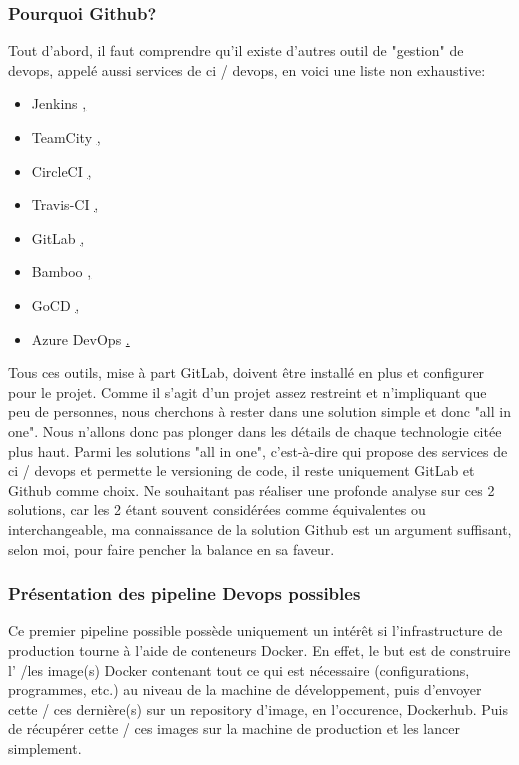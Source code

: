 \documentclass[
    iai, %
    il, %
]{heig-tb}
\begin{document}
\subsubsection{Pourquoi Github?}
Tout d'abord, il faut comprendre qu'il existe d'autres outil de "gestion" de \Gls{devops}, appelé aussi services de \Gls{ci} / \Gls{devops}, en voici une liste non exhaustive:
\begin{itemize}
    \item Jenkins \href{https://www.jenkins.io/},
    \item TeamCity \href{https://www.jetbrains.com/teamcity/},
    \item CircleCI \href{https://www.guru99.com/top-20-continuous-integration-tools.html},
    \item Travis-CI \href{https://www.travis-ci.com/},
    \item GitLab \href{https://about.gitlab.com/},
    \item Bamboo \href{https://www.atlassian.com/software/bamboo},
    \item GoCD \href{https://www.gocd.org/},
    \item Azure DevOps \href{https://azure.microsoft.com/fr-fr/services/devops/}.
\end{itemize}

Tous ces outils, mise à part GitLab, doivent être installé en plus et configurer pour le projet.
Comme il s'agit d'un projet assez restreint et n'impliquant que peu de personnes, nous cherchons à rester dans une solution simple et donc "all in one".
Nous n'allons donc pas plonger dans les détails de chaque technologie citée plus haut.
Parmi les solutions "all in one", c'est-à-dire qui propose des services de \Gls{ci} / \Gls{devops} et permette le versioning de code, il reste uniquement GitLab et Github comme choix.
Ne souhaitant pas réaliser une profonde analyse sur ces 2 solutions, car les 2 étant souvent considérées comme équivalentes ou interchangeable, ma connaissance de la solution Github est un argument suffisant, selon moi, pour faire pencher la balance en sa faveur.

\subsubsection{Présentation des pipeline Devops possibles}
Ce premier pipeline possible possède uniquement un intérêt si l'infrastructure de production tourne à l'aide de conteneurs Docker. En effet, le but est de construire l' /les image(s) Docker contenant tout ce qui est nécessaire (configurations, programmes, etc.) au niveau de la machine de développement, puis d'envoyer cette / ces dernière(s) sur un repository d'image, en l'occurence, Dockerhub. Puis de récupérer cette / ces images sur la machine de production et les lancer simplement.
\end{document}

